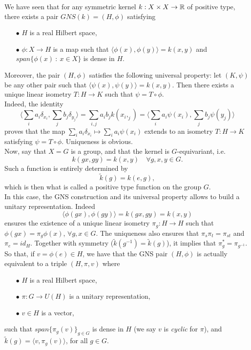 We have seen that for any symmetric kernel $k: X\times X \rightarrow \mathbb R$ of positive type, there exists a pair $GNS(k)=(H,\phi)$ satisfying
\begin{itemize}
\item[$\bullet$] $H$ is a real Hilbert space,
\item[$\bullet$] $\phi : X\rightarrow H$ is a map such that $\langle \phi(x),\phi(y) \rangle = k(x,y)$ and $span \{ \phi(x)\ : \ x\in X \} $ is dense in $H$. 
\end{itemize}

Moreover, the pair $(H,\phi)$ satisfies the following universal property: let $(K,\psi)$ be any other pair such that $\langle \psi(x),\psi(y) \rangle = k(x,y)$. Then there exists a unique linear isometry $T: H\rightarrow K$ such that $\psi = T \circ \phi$.\\

Indeed, the identity 
\[\langle \sum_i a_i \delta_{x_i}, \sum_j b_j \delta_{y_j} \rangle  = \sum_{i,j} a_i b_j k(x_i,_j) =\langle \sum_i a_i \psi(x_i), \sum_j b_j \psi(y_j) \rangle\]
proves that the map $\sum_i a_i \delta_{x_i}\mapsto  \sum_i a_i \psi(x_i)$ extends to an isometry $T:H \rightarrow K $ satisfying $\psi = T \circ \phi$. Uniqueness is obvious.\\

Now, say that $X=G$ is a group, and that the kernel is $G$-equivariant, i.e.
\[k(gx,gy) = k(x,y)\quad \forall g,x,y\in G.\]
Such a function is entirely determined by 
\[\tilde k (g) = k(e,g),\]
which is then what is called a positive type function on the group $G$.\\

In this case, the GNS construction and its universal property allows to build a unitary representation. Indeed 
\[\langle \phi(gx),\phi(gy) \rangle = k(gx,gy) = k(x,y)\] 
ensures the existence of a unique linear isometry $\pi_g: H \rightarrow H$ such that $\phi(gx) = \pi_g \phi(x)$, $\forall g,x \in G$. The uniqueness also ensures that $\pi_s \pi_t = \pi_{st} $ and $\pi_e = id_H$. Together with symmetry ($\tilde k(g^{-1})=\tilde k(g)$), it implies that $\pi_g^*=\pi_{g^{-1}}$. So that, if $v= \phi(e)\in H$, we have that the GNS pair $(H,\phi)$ is actually equivalent to a triple $(H,\pi, v)$ where 
\begin{itemize}
\item[$\bullet$] $H$ is a real Hilbert space,
\item[$\bullet$] $\pi : G\rightarrow U(H)$ is a unitary representation, 
\item[$\bullet$] $v\in H$ is a vector,
\end{itemize}
such that $span \{ \pi_g (v)\}_{g\in G}$ is dense in $H$ (we say $v$ is \textit{cyclic} for $\pi$), and $\tilde k(g)=\langle v , \pi_g (v)\rangle$, for all $g\in G$.\\

